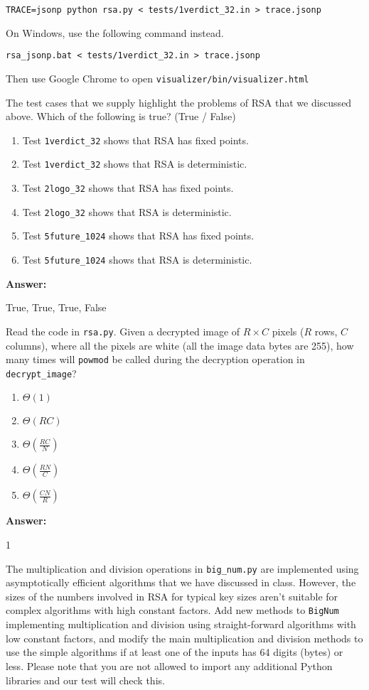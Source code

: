 \documentclass[12pt,twoside]{article}
\newcommand{\answer}{
 \par\medskip
 \textbf{Answer:}
}
\newcommand{\answerIIIe}{ \answer
True, True, True, False
}
\newcommand{\answerIIIf}{ \answer
1
}
\begin{document}
\begin{problems}
\texttt{TRACE=jsonp python rsa.py < tests/1verdict\_32.in > trace.jsonp}

On Windows, use the following command instead.

\texttt{rsa\_jsonp.bat < tests/1verdict\_32.in > trace.jsonp}

Then use Google Chrome to open
\texttt{visualizer/bin/visualizer.html}

\begin{problemparts}
\problempart {} The test cases that we supply highlight the problems of
RSA that we discussed above. Which of the following is true? (True / False)
\begin{enumerate}
  \item Test \texttt{1verdict\_32} shows that RSA has fixed points.
  \item Test \texttt{1verdict\_32} shows that RSA is deterministic.
  \item Test \texttt{2logo\_32} shows that RSA has fixed points.
  \item Test \texttt{2logo\_32} shows that RSA is deterministic.
  \item Test \texttt{5future\_1024} shows that RSA has fixed points.
  \item Test \texttt{5future\_1024} shows that RSA is deterministic.
\end{enumerate}
\answerIIIe

\problempart {} Read the code in \texttt{rsa.py}. Given a decrypted
image of $R \times C$ pixels ($R$ rows, $C$ columns), where all the pixels
are white (all the image data bytes are 255), how many times will
\texttt{powmod} be called during the decryption operation in
\texttt{decrypt\_image}?
\begin{enumerate}
  \item $\Theta(1)$
  \item $\Theta(R C)$
  \item $\Theta(\frac{RC}{N})$
  \item $\Theta(\frac{RN}{C})$
  \item $\Theta(\frac{CN}{R})$
\end{enumerate}
\answerIIIf

\problempart {} The multiplication and division operations in
\texttt{big\_num.py} are implemented using asymptotically efficient algorithms
that we have discussed in class. However, the sizes of the numbers involved in
RSA for typical key sizes aren't suitable for complex algorithms with high
constant factors. Add new methods to \texttt{BigNum} implementing multiplication
and division using straight-forward algorithms with low constant factors, and
modify the main multiplication and division methods to use the simple algorithms
if at least one of the inputs has 64 digits (bytes) or less. Please note that
you are not allowed to import any additional Python libraries and our test will
check this.
\end{problemparts}


\end{problems}
\end{document}
